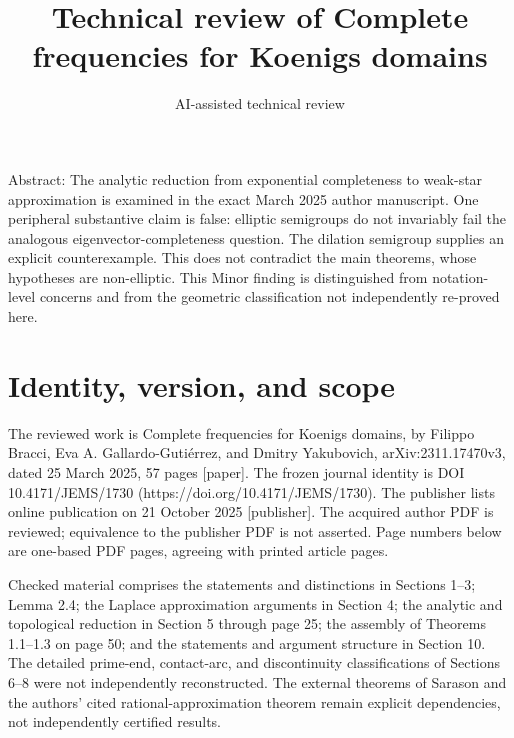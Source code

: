 \documentclass[10pt]{article}
\title{Technical review of Complete frequencies for Koenigs domains}
\author{AI-assisted technical review}
\date{}
\begin{document}
\maketitle
Abstract: The analytic reduction from exponential completeness to weak-star approximation is examined in the exact March 2025 author manuscript. One peripheral substantive claim is false: elliptic semigroups do not invariably fail the analogous eigenvector-completeness question. The dilation semigroup supplies an explicit counterexample. This does not contradict the main theorems, whose hypotheses are non-elliptic. This Minor finding is distinguished from notation-level concerns and from the geometric classification not independently re-proved here.\par
\section*{Identity, version, and scope}
The reviewed work is Complete frequencies for Koenigs domains, by Filippo Bracci, Eva A. Gallardo-Gutiérrez, and Dmitry Yakubovich, arXiv:2311.17470v3, dated 25 March 2025, 57 pages [paper]. The frozen journal identity is DOI 10.4171/JEMS/1730 (https://doi.org/10.4171/JEMS/1730). The publisher lists online publication on 21 October 2025 [publisher]. The acquired author PDF is reviewed; equivalence to the publisher PDF is not asserted. Page numbers below are one-based PDF pages, agreeing with printed article pages.\par
Checked material comprises the statements and distinctions in Sections 1–3; Lemma 2.4; the Laplace approximation arguments in Section 4; the analytic and topological reduction in Section 5 through page 25; the assembly of Theorems 1.1–1.3 on page 50; and the statements and argument structure in Section 10. The detailed prime-end, contact-arc, and discontinuity classifications of Sections 6–8 were not independently reconstructed. The external theorems of Sarason and the authors’ cited rational-approximation theorem remain explicit dependencies, not independently certified results.\par
\end{document}
